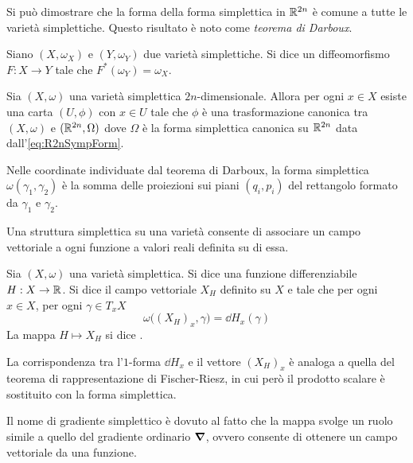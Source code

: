 Si può dimostrare che la forma della forma simplettica in $\mathbb{R}^{2n}$ è comune a tutte le varietà simplettiche. Questo risultato è noto come \emph{teorema di Darboux}.

\begin{definition}
  Siano $(X, \omega_X)$ e $(Y, \omega_Y)$ due varietà simplettiche. Si dice  un diffeomorfismo $F:X\to Y$ tale che $F^*(\omega_Y) = \omega_X$. 
\end{definition}
\begin{theorem}[Darboux]
  Sia $(X,\omega)$ una varietà simplettica $2n$-dimensionale. Allora per ogni $x \in X$ esiste una carta $(U,\phi)$ con $x \in U$ tale che $\phi$ è una trasformazione canonica tra $(X,\omega)$ e $(\mathbb{R}^{2n}, \Omega)$ dove $\Omega$ è la forma simplettica canonica su $\mathbb{R}^{2n}$ data dall'\autoref{eq:R2nSympForm}.
\end{theorem}
\begin{remark}
  Nelle coordinate individuate dal teorema di Darboux, la forma simplettica $\omega(\gamma_1,\gamma_2)$ è la somma delle proiezioni sui piani $(q_i, p_i)$ del rettangolo formato da $\gamma_1$ e $\gamma_2$.
\end{remark}

Una struttura simplettica su una varietà consente di associare un campo vettoriale a ogni funzione a valori reali definita su di essa. 
\begin{definition} \label{def:hamField}
  Sia $(X, \omega)$ una varietà simplettica. Si dice  una funzione differenziabile $H: X \to \mathbb{R}$. Si dice  il campo vettoriale $X_H$ definito su $X$ e tale che per ogni $x \in X$, per ogni $\gamma \in T_x X$
  \begin{equation} \label{eq:hamField}
    \omega\big((X_H)_x, \gamma\big) = \dd{H}_x(\gamma)
  \end{equation}
  La mappa $H \mapsto X_H$ si dice .
\end{definition}
\begin{remark}
  La corrispondenza tra l'$1$-forma $\dd{H}_x$ e il vettore $(X_H)_x$ è analoga a quella del teorema di rappresentazione di Fischer-Riesz, in cui però il prodotto scalare è sostituito con la forma simplettica.
\end{remark}
\begin{definition}
  Il nome di gradiente simplettico è dovuto al fatto che la mappa svolge un ruolo simile a quello del gradiente ordinario $\grad$, ovvero consente di ottenere un campo vettoriale da una funzione.
\end{definition}

